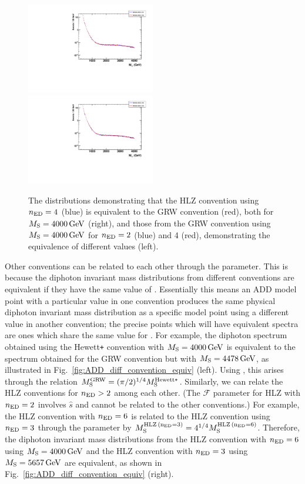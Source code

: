\begin{figure}[!htbp]
  \includegraphics[width=0.50\textwidth]{figures/diphoton_mgg_acc_MS4000_NED4_KK1_MS4000_NED4_KK5}
  \includegraphics[width=0.50\textwidth]{figures/diphoton_mgg_acc_MS4000_NED2_KK5_MS4000_NED4_KK5}
  \caption{The \mgg distributions demonstrating that the HLZ convention using $n_{\rm ED} = 4$ (blue) is equivalent to the GRW convention (red), both for $M_{\rm S} = 4000\,\text{Ge\hspace{-.08em}V}$ (right), and those from the GRW convention using $M_{\rm S} = 4000\,\text{Ge\hspace{-.08em}V}$ for $n_{\rm ED} = 2$ (blue) and 4 (red), demonstrating the equivalence of different \nED values (left).}
  \label{fig:ADD_cross_checks}
\end{figure}

Other conventions can be related to each other through the \etaG parameter. This is because the diphoton invariant mass distributions from different conventions are equivalent if they have the same value of \etaG. Essentially this means an ADD model point with a particular \Ms value in one convention produces the same physical diphoton invariant mass distribution as a specific model point using a different \Ms value in another convention; the precise points which will have equivalent spectra are ones which share the same value for \etaG. For example, the diphoton spectrum obtained using the Hewett\texttt{+} convention with $M_{\rm S}=4000\,\text{Ge\hspace{-.08em}V}$ is equivalent to the spectrum obtained for the GRW convention but with $M_{\rm S}=4478\,\text{Ge\hspace{-.08em}V}$, as illustrated in Fig.~\ref{fig:ADD_diff_convention_equiv} (left). Using \etaG, this arises through the relation $M_{\mathrm{S}}^{\rm GRW} = (\pi/2)^{1/4} M_{\mathrm{S}}^{\rm Hewett\texttt{+}}$. Similarly, we can relate the HLZ conventions for $n_{\rm ED} > 2$ among each other. (The $\mathcal{F}$ parameter for HLZ with $n_{\rm ED}=2$ involves $\hat{s}$ and cannot be related to the other conventions.) For example, the HLZ convention with $n_{\rm ED} = 6$ is related to the HLZ convention using $n_{\rm ED} = 3$ through the \etaG parameter by $M_{\mathrm{S}}^{\rm{HLZ} \,(n_{\rm ED}=3)} = 4^{1/4} M_{\mathrm{S}}^{\rm{HLZ} \,(n_{\rm ED}=6)}$. Therefore, the diphoton invariant mass distributions from the HLZ convention with $n_{\rm ED} = 6$ using $M_{\rm S} = 4000\,\text{Ge\hspace{-.08em}V}$ and the HLZ convention with $n_{\rm ED} = 3$ using $M_{\rm S} = 5657\,\text{Ge\hspace{-.08em}V}$ are equivalent, as shown in Fig.~\ref{fig:ADD_diff_convention_equiv} (right).

